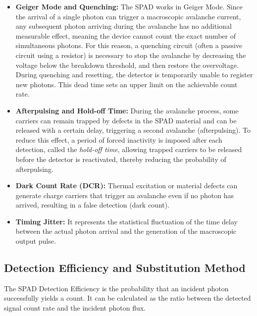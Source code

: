 \documentclass[10pt,letterpaper]{report}
\begin{document}
\begin{itemize}

    \item \textbf{Geiger Mode and Quenching:} The SPAD works in Geiger Mode. Since the arrival of a single photon can trigger a macroscopic avalanche current, any subsequent photon arriving during the avalanche has no additional measurable effect, meaning the device cannot count the exact number of simultaneous photons. 
        For this reason, a quenching circuit (often a passive circuit using a resistor) is necessary to stop the avalanche by decreasing the voltage below the breakdown threshold, and then restore the overvoltage.
        During quenching and resetting, the detector is temporarily unable to register new photons. This dead time sets an upper limit on the achievable count rate.

    \item \textbf{Afterpulsing and Hold-off Time:} During the avalanche process, some carriers can remain trapped by defects in the SPAD material and can be released with a certain delay, triggering a second avalanche (afterpulsing).
        To reduce this effect, a period of forced inactivity is imposed after each detection, called the \textit{hold-off time}, allowing trapped carriers to be released before the detector is reactivated, thereby reducing the probability of afterpulsing.

    \item \textbf{Dark Count Rate (DCR):} Thermal excitation or material defects can generate charge carriers that trigger an avalanche even if no photon has arrived, resulting in a false detection (dark count).

    \item \textbf{Timing Jitter:} It represents the statistical fluctuation of the time delay between the actual photon arrival and the generation of the macroscopic output pulse.

\end{itemize}



\subsection{Detection Efficiency and Substitution Method}

The SPAD Detection Efficiency is the probability that an incident photon successfully yields a count.
It can be calculated as the ratio between the detected signal count rate and the incident photon flux.
\end{document}
